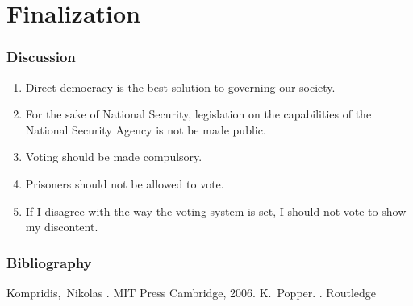 \documentclass{beamer}
\begin{document}
\section{Finalization}
\begin{frame}\frametitle{\textbf{\LARGE{\textrm{Discussion}}}}
\begin{enumerate}
  \item Direct democracy is the best solution to governing our society.
  \item For the sake of National Security, legislation on the capabilities of the National Security Agency is not be made public.
  \item Voting should be made compulsory.
  \item Prisoners should not be allowed to vote.
  \item If I disagree with the way the voting system is set, I should not vote to show my discontent.
\end{enumerate}
\end{frame}

\begin{frame}[allowframebreaks]
  \frametitle<presentation>{Bibliography}    
  \begin{thebibliography}{10}    
  \beamertemplatebookbibitems
    Kompridis,~Nikolas
    .
    \newblock MIT Press Cambridge, 2006.
  \beamertemplatebookbibitems
    K.~Popper.
    .
    \newblock Routledge
  \end{thebibliography}
\end{frame}
\end{document}
